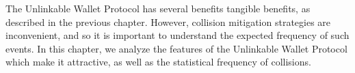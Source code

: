 The Unlinkable Wallet Protocol has several benefits tangible benefits, as described in the previous chapter.
However, collision mitigation strategies are inconvenient, and so it is important to understand the expected frequency of such events.
In this chapter, we analyze the features of the Unlinkable Wallet Protocol which make it attractive,
    as well as the statistical frequency of collisions.